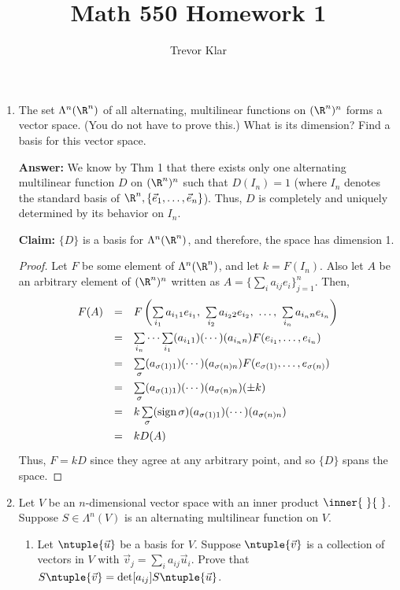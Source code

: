 \documentclass[letterpaper]{article}
\title{Math 550 \linebreak
Homework 1}
\author{Trevor Klar}
\begin{document}
\maketitle

\begin{enumerate}
\item The set $\Lambda^n(\R^n)$ of all alternating, multilinear functions on $(\R^n)^n$ forms a vector space. (You do not have to prove this.) What is its dimension? Find a basis for this vector space. 
 
\textbf{Answer: }
We know by Thm 1 that there exists only one alternating multilinear function $D$ on $(\R^n)^n$ such that $D(I_n)=1$ (where $I_n$ denotes the standard basis of $\R^n, \{\vec{e}_1, \ldots, \vec{e}_n\}$). Thus, $D$ is completely and uniquely determined by its behavior on $I_n$.

\textbf{Claim:} $\{D\}$ is a basis for $\Lambda^n(\R^n)$, and therefore, the space has dimension 1. 

\begin{proof}
Let $F$ be some element of $\Lambda^n(\R^n)$, and let $k=F(I_n)$. Also let $A$ be an arbitrary element of $(\R^n)^n$ written as $A=\{\sum_{i}a_{ij}e_i\}_{j=1}^n$. Then, 
\[\def\arraystretch{1.5}
\begin{array}{rcl}
F(A)&=&F\left(\sum\limits_{i_1}a_{i_11}e_{i_1}, \, \, \sum\limits_{i_2}a_{i_22}e_{i_2}, \, \, \dots , \, \, \sum\limits_{i_n}a_{i_nn}e_{i_n}\right)\\
&=&\sum\limits_{i_n} \dots \sum\limits_{i_1} (a_{{i_1}1})(\cdots)(a_{{i_n}n}) F(e_{{i_1}}, \ldots, e_{{i_n}})  \\
&=& \sum\limits_\sigma (a_{{\sigma(1)}1})(\cdots)(a_{{\sigma(n)}n}) F(e_{\sigma(1)}, \dots, e_{\sigma(n)}) \\
&=& \sum\limits_\sigma (a_{{\sigma(1)}1})(\cdots)(a_{{\sigma(n)}n}) (\pm k) \\
&=& k\sum\limits_\sigma (\text{sign}\,\sigma)(a_{{\sigma(1)}1})(\cdots)(a_{{\sigma(n)}n})\\
&=& kD(A)\\
\end{array}\]
Thus, $F=kD$ since they agree at any arbitrary point, and so $\{D\}$ spans the space. 
\end{proof}

\item Let $V$ be an $n$-dimensional vector space with an inner product $\inner{\,\,}{\,\,}$. Suppose $S\in \Lambda^n(V)$ is an alternating multilinear function on $V$. 
	\begin{enumerate}
	\item Let $\ntuple{\vec{u}}$ be a basis for $V$. Suppose $\ntuple{\vec{v}}$ is a collection of vectors in $V$ with $\vec{v}_j=\sum_i a_{ij}\vec{u}_i$. Prove that $S\ntuple{\vec{v}} = \det[a_{ij}] S\ntuple{\vec{u}}$. 
	

\end{enumerate}
\end{enumerate}
\end{document}
